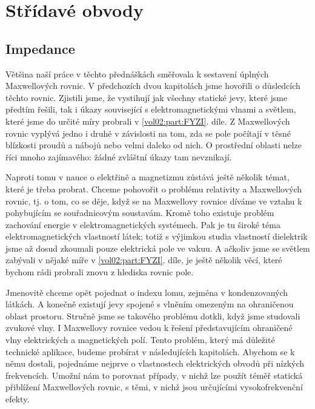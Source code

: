 \setchaptertoc
\chapter{Střídavé obvody}\label{fyz:IIchapXXII}

\section{Impedance}\label{fyz:IIchapXXIIsecI}
  Většina naší práce v těchto přednáškách směřovala k sestavení úplných Maxwellových rovnic. V 
  předchozích dvou kapitolách jsme hovořili o důsledcích těchto rovnic. Zjistili jsme, že vystihují 
  jak všechny statické jevy, které jsme předtím řešili, tak i úkazy související s 
  elektromagnetickými vlnami a světlem, které jsme do určité míry probrali v \ref{vol02:part:FYZI}. díle. 
  Z Maxwellových rovnic vyplývá jedno i druhé v závislosti na tom, zda se pole počítají v těsné 
  blízkosti proudů a nábojů nebo velmi daleko od nich. O prostřední oblasti nelze říci mnoho 
  zajímavého: žádné zvláštní úkazy tam nevznikají.
  
  Naproti tomu v nauce o elektřině a magnetizmu zůstává ještě několik témat, které je třeba 
  probrat. Chceme pohovořit o problému relativity a Maxwellových rovnic, tj. o tom, co se děje, 
  když se na Maxwellovy rovnice díváme ve vztahu k pohybujícím se souřadnicovým soustavám. Kromě 
  toho existuje problém zachování energie v elektromagnetických systémech. Pak je tu široké téma 
  elektromagnetických vlastností látek; totiž s výjimkou studia vlastností dielektrik jsme až dosud 
  zkoumali pouze elektrická pole ve vakuu. A ačkoliv jsme se světlem zabývali v nějaké míře v 
  \ref{vol02:part:FYZI}. díle, je ještě několik věcí, které bychom rádi probrali znovu z hlediska rovnic 
  pole.
  
  Jmenovitě chceme opět pojednat o indexu lomu, zejména v kondenzovaných látkách. A konečně 
  existují jevy spojené s vlněním omezeným na ohraničenou oblast prostoru. Stručně jsme se takového 
  problému dotkli, když jsme studovali zvukové vlny. I Maxwellovy rovnice vedou k řešení 
  představujícím ohraničené vlny elektrických a magnetických polí. Tento problém, který má důležité 
  technické aplikace, budeme probírat v následujících kapitolách. Abychom se k němu dostali, 
  pojednáme nejprve o vlastnostech elektrických obvodů při nízkých frekvencích. Umožní nám to 
  porovnat případy, v nichž lze použít téměř statická přiblížení Maxwellových rovnic, s těmi, v 
  nichž jsou určujícími vysokofrekvenční efekty.
  
